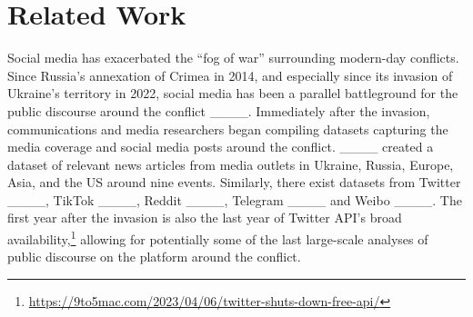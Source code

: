 \section{Related Work}



Social media has exacerbated the ``fog of war'' surrounding modern-day conflicts.
Since Russia's annexation of Crimea in 2014, and especially since its invasion of Ukraine's territory in 2022, social media has been a parallel battleground for the public discourse around the conflict ____. 
Immediately after the invasion, communications and media researchers began compiling datasets capturing the media coverage and social media posts around the conflict.
____ created a dataset of relevant news articles from media outlets in Ukraine, Russia, Europe, Asia, and the US around nine events. 
Similarly, there exist datasets from Twitter ____, TikTok ____, Reddit ____, Telegram ____ and Weibo ____.
The first year after the invasion is also the last year of Twitter API's broad availability,\footnote{\url{https://9to5mac.com/2023/04/06/twitter-shuts-down-free-api/}} allowing for potentially some of the last large-scale analyses of public discourse on the platform around the conflict. 


